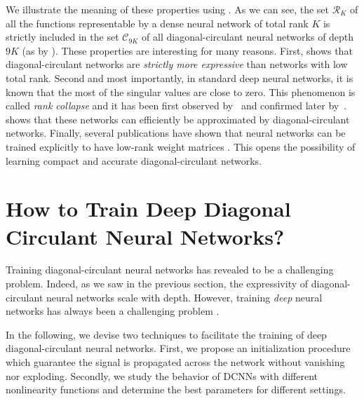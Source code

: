 \noindent
We illustrate the meaning of these properties using .
As we can see, the set $\mathcal{R}_K$ of all the functions representable by a dense neural network of total rank $K$ is strictly included in the set $\mathcal C_{9K}$ of all diagonal-circulant neural networks of depth $9K$ (as by ).
These properties are interesting for many reasons. 
First,  shows that diagonal-circulant networks are \emph{strictly more expressive} than networks with low total rank. 
Second and most importantly, in standard deep neural networks, it is known that the most of the singular values are close to zero. This phenomenon is called \emph{rank collapse} and it has been first observed by~\citet{saxe2013exact} and confirmed later by~\citet{sedghi2018singular,arora2019implicit}.
 shows that these networks can efficiently be approximated by diagonal-circulant networks.
Finally, several publications have shown that neural networks can be trained explicitly to have low-rank weight matrices \cite{chong18eccv, goyal2019compression}.
This opens the possibility of learning compact and accurate diagonal-circulant networks.


\section{How to Train Deep Diagonal Circulant Neural Networks?}
\label{section:ch4-how_to_train_deep_diagonal_circulant_neural_networks}

Training diagonal-circulant neural networks has revealed to be a challenging problem.
Indeed, as we saw in the previous section, the expressivity of diagonal-circulant neural networks scale with depth.
However, training \emph{deep} neural networks has always been a challenging problem \cite{he2016deep}.

In the following, we devise two techniques to facilitate the training of deep diagonal-circulant neural networks.
First, we propose an initialization procedure which guarantee the signal is propagated across the network without vanishing nor exploding.
Secondly, we study the behavior of DCNNs with different nonlinearity functions and determine the best parameters for different settings. 

